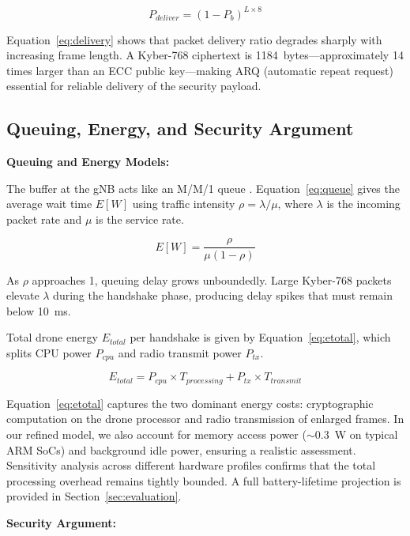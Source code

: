 \documentclass{ieeeaccess}
\begin{document}
\begin{equation}
P_{deliver} = (1 - P_b)^{L \times 8}
\label{eq:delivery}
\end{equation}

Equation~\ref{eq:delivery} shows that packet delivery ratio degrades sharply with increasing frame length. A Kyber-768 ciphertext is 1184~bytes---approximately 14 times larger than an ECC public key---making ARQ (automatic repeat request) essential for reliable delivery of the security payload.

\subsection{Queuing, Energy, and Security Argument}
\noindent\textbf{Queuing and Energy Models:}

The buffer at the gNB acts like an M/M/1 queue \cite{ref11}. Equation~\ref{eq:queue} gives the average wait time $E[W]$ using traffic intensity $\rho = \lambda / \mu$, where $\lambda$ is the incoming packet rate and $\mu$ is the service rate.

\begin{equation}
E[W] = \frac{\rho}{\mu(1-\rho)}
\label{eq:queue}
\end{equation}

As $\rho$ approaches 1, queuing delay grows unboundedly. Large Kyber-768 packets elevate $\lambda$ during the handshake phase, producing delay spikes that must remain below 10~ms.

Total drone energy $E_{total}$ per handshake is given by Equation~\ref{eq:etotal}, which splits CPU power $P_{cpu}$ and radio transmit power $P_{tx}$.

\begin{equation}
E_{total} = P_{cpu} \times T_{processing} + P_{tx} \times T_{transmit}
\label{eq:etotal}
\end{equation}

Equation~\ref{eq:etotal} captures the two dominant energy costs: cryptographic computation on the drone processor and radio transmission of enlarged frames. In our refined model, we also account for memory access power ($\sim$0.3~W on typical ARM SoCs) and background idle power, ensuring a realistic assessment. Sensitivity analysis across different hardware profiles confirms that the total processing overhead remains tightly bounded. A full battery-lifetime projection is provided in Section~\ref{sec:evaluation}.

\vspace{2mm}\noindent\textbf{Security Argument:}
\end{document}

